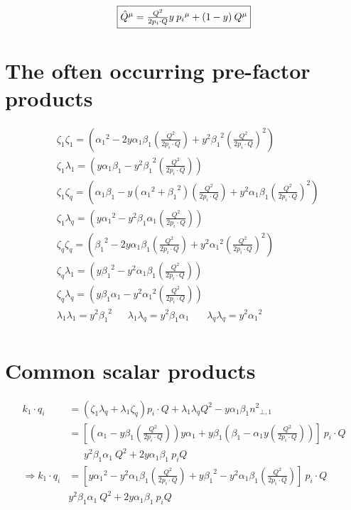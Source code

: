 \begin{equation}
	\begin{aligned}
		\fbox{$  {\hat{{Q}}}^{\mu}= \frac{Q^2}{2p_i \cdot Q}y \:{p_i}^{\mu}+(1-y)\:{Q}^{\mu} $}
    \end{aligned}
\end{equation}

\section*{The often occurring pre-factor products}

\begin{equation}
	\begin{split}
	&\zeta_1\zeta_1=({\alpha_1}^2 -2y\alpha_1 \beta_1(\frac{Q^2}{2p_i \cdot Q})+y^2{\beta_1}^2(\frac{Q^2}{2p_i \cdot Q})^2)\\
	&\zeta_1\lambda_1=(y\alpha_1\beta_1 -{y^2\beta_1}^2(\frac{Q^2}{2p_i \cdot Q}))\\
	&\zeta_1\zeta_q=(\alpha_1\beta_1-y({\alpha_1}^2+{\beta_1}^2) (\frac{Q^2}{2p_i \cdot Q})+y^2{\alpha_1}{\beta_1}(\frac{Q^2}{2p_i \cdot Q})^2)\\
	&\zeta_1\lambda_q=(y{\alpha_1}^2 -y^2\beta_1\alpha_1(\frac{Q^2}{2p_i \cdot Q}))\\
	&\zeta_q\zeta_q=	({\beta_1}^2 -2y\alpha_1\beta_1 (\frac{Q^2}{2p_i \cdot Q})+ y^2{\alpha_1}^2 (\frac{Q^2}{2p_i \cdot Q})^2) \\
	&\zeta_q\lambda_1=(y{\beta_1}^2 -y^2\alpha_1 \beta_1(\frac{Q^2}{2p_i \cdot Q}))\\
	&\zeta_q\lambda_q=(y\beta_1\alpha_1 -y^2{\alpha_1}^2(\frac{Q^2}{2p_i \cdot Q}))\\
	&\lambda_1\lambda_1=y^2{\beta_1}^2 \:\:\:\:\:\:\:
	\lambda_1\lambda_q=y^2\beta_1\alpha_1\:\:\:\:\:\:\:\:
	\lambda_q\lambda_q=y^2{\alpha_1}^2\\
    \end{split}
\end{equation}

\section*{Common scalar products}

\begin{equation}
	\begin{aligned}	
k_1 \cdot q_i &= (\zeta_1 \lambda_q + \lambda_1 \zeta_q)p_i \cdot Q+\lambda_1 \lambda_q Q^2 -y\alpha_1\beta_1 {n^{2}}_{\bot,1}\\
	&=[(\alpha_1 -y\beta_1(\frac{Q^2}{2p_i \cdot Q}))y\alpha_1+y\beta_1(\beta_1 -\alpha_1 y(\frac{Q^2}{2p_i \cdot Q}))]\:p_i \cdot Q\\
	&\:\:\:\:\:\:\:y^2\beta_1\alpha_1\: Q^2+2y\alpha_1\beta_1\:p_iQ\\
\Rightarrow	k_1 \cdot q_i &=[y{\alpha_1}^2 -y^2\alpha_1\beta_1(\frac{Q^2}{2p_i \cdot Q})+y {\beta_1}^2-y^2\alpha_1\beta_1(\frac{Q^2}{2p_i \cdot Q})]\:p_i\cdot Q\\
	&y^2\beta_1\alpha_1\: Q^2+2y\alpha_1\beta_1\:p_iQ\\	
    \end{aligned}
\end{equation}

